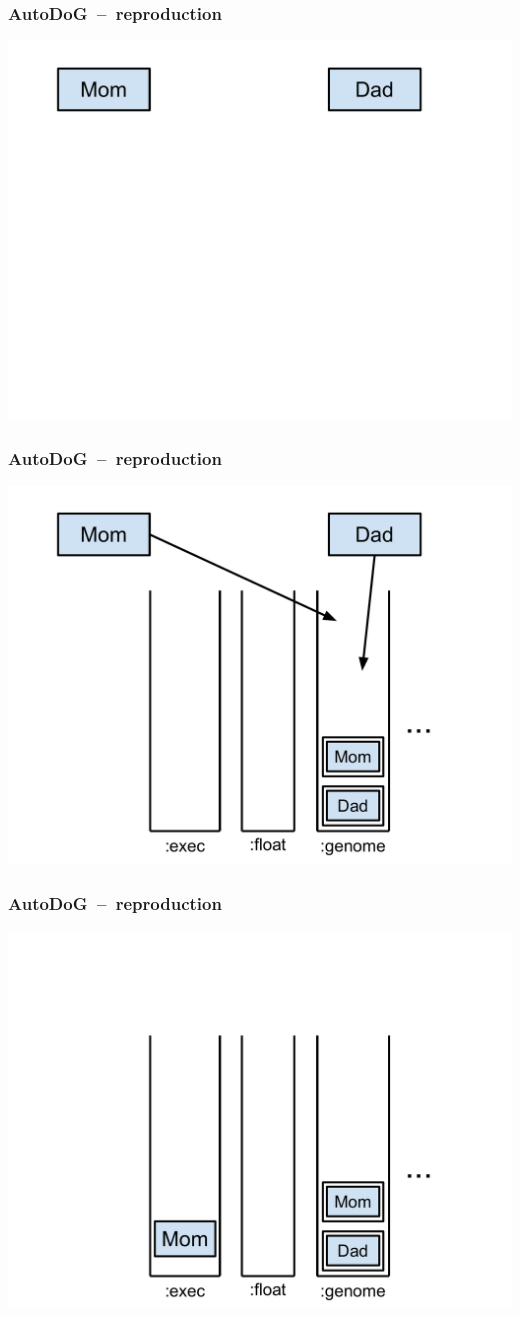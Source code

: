 \documentclass{beamer}
\begin{document}
\begin{frame}
	\frametitle{AutoDoG~--~reproduction}
	\includegraphics[width=.9\textwidth]{Illustrations/autodog_2.PDF}
\end{frame}

\begin{frame}
	\frametitle{AutoDoG~--~reproduction}
	\includegraphics[width=.9\textwidth]{Illustrations/autodog_3.PDF}
\end{frame}

\begin{frame}
	\frametitle{AutoDoG~--~reproduction}
	\includegraphics[width=.9\textwidth]{Illustrations/autodog_4.PDF}
\end{frame}
\end{document}
